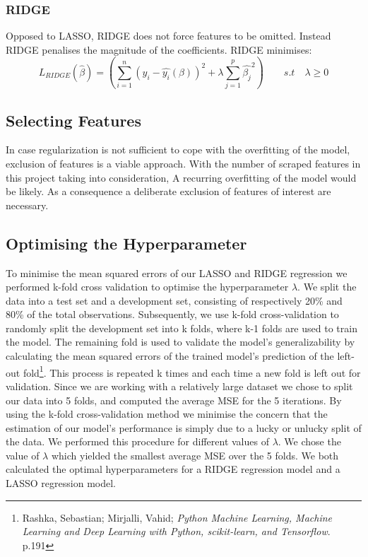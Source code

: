 \documentclass[12pt,a4paper]{article}
\begin{document}
\subsubsection{RIDGE}
Opposed to LASSO, RIDGE does not force features to be omitted. Instead RIDGE penalises the magnitude of the coefficients. RIDGE minimises:
$$L_{RIDGE}(\hat{\beta}) = \left(\sum_{i=1}^{n} (y_i-\hat{y_i}(\beta))^2+\lambda\sum_{j=1}^{p}\hat{\beta_j}^2\right) \qquad s.t \quad \lambda \geq 0 $$ 

\subsection{Selecting Features}
In case regularization is not sufficient to cope with the overfitting of the model, exclusion of features is a viable approach. With the number of scraped features in this project taking into consideration, A recurring overfitting of the model would be likely. As a consequence a deliberate exclusion of features of interest are necessary.    

\subsection{Optimising the Hyperparameter}
To minimise the mean squared errors of our LASSO and RIDGE regression we performed k-fold cross validation to optimise the hyperparameter $\lambda$. 
We split the data into a test set and a development set, consisting of respectively 20\% and 80\% of the total observations. Subsequently, we use k-fold cross-validation to randomly split the development set into k folds, where k-1 folds are used to train the model. The remaining fold is used to validate the model’s generalizability by calculating the mean squared errors of the trained model’s prediction of the left-out fold\footnote{Rashka, Sebastian; Mirjalli, Vahid; \textit{Python Machine Learning, Machine Learning and Deep Learning with Python, scikit-learn, and Tensorflow}. p.191}. This process is repeated k times and each time a new fold is left out for validation. Since we are working with a relatively large dataset we chose to split our data into 5 folds, and computed the average MSE for the 5 iterations. By using the k-fold cross-validation method we minimise the concern that the estimation of our model’s performance is simply due to a lucky or unlucky split of the data. \newline
We performed this procedure for different values of $\lambda$. We chose the value of $\lambda$ which yielded the smallest average MSE over the 5 folds. 
We both calculated the optimal hyperparameters for a RIDGE regression model and a LASSO regression model.
\end{document}
